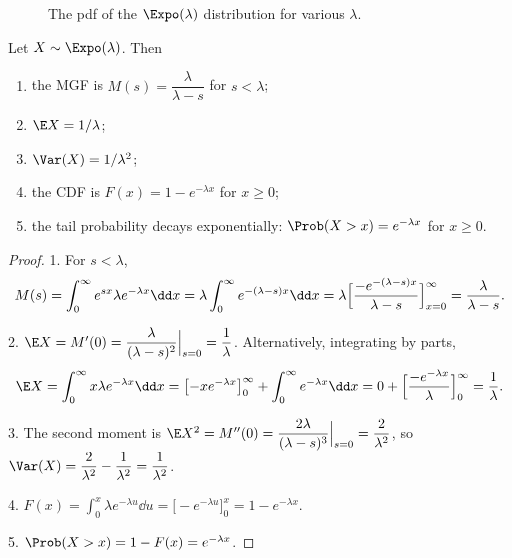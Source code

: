 \begin{figure}[ht]
\centering
{}
\caption{The pdf of the $\Expo(\lambda)$ distribution for various $\lambda$.}
\label{fig:exponential-pdfs}
\end{figure}


\begin{theorem}\label{thm:exponential-properties}
Let $X \sim \Expo(\lambda)$. Then
\begin{enumerate}
  \item the MGF is $M(s) = \dfrac{\lambda}{\lambda - s}$ for $s < \lambda$;
  \item $\E X = 1/\lambda$;
  \item $\Var(X) = 1/\lambda^2$;
  \item the CDF is $F(x) = 1 - e^{-\lambda x}$ for $x \ge 0$;
  \item the tail probability decays exponentially: $\Prob(X > x) = e^{-\lambda x}$ for $x \ge 0$.
\end{enumerate}
\end{theorem}

\begin{proof}
1. For $s < \lambda$,
\[
  M(s) = \int_0^\infty e^{sx} \lambda e^{-\lambda x} \dd x = \lambda \int_0^\infty e^{-(\lambda - s)x} \dd x = \lambda \Bigl[\frac{-e^{-(\lambda - s)x}}{\lambda - s}\Bigr]_{x=0}^\infty = \frac{\lambda}{\lambda - s}.
\]

2. $\E X = M'(0) = \dfrac{\lambda}{(\lambda - s)^2}\Big|_{s=0} = \dfrac1\lambda$. Alternatively, integrating by parts,
\[
  \E X = \int_0^\infty x \lambda e^{-\lambda x} \dd x = \bigl[-x e^{-\lambda x}\bigr]_0^\infty + \int_0^\infty e^{-\lambda x} \dd x = 0 + \Bigl[\frac{-e^{-\lambda x}}{\lambda}\Bigr]_0^\infty = \frac1\lambda.
\]

3. The second moment is $\E X^2 = M''(0) = \dfrac{2\lambda}{(\lambda - s)^3}\Big|_{s=0} = \dfrac{2}{\lambda^2}$, so $\Var(X) = \dfrac{2}{\lambda^2} - \dfrac{1}{\lambda^2} = \dfrac{1}{\lambda^2}$.

4. $F(x) = \int_0^x \lambda e^{-\lambda u} \dd u = \bigl[-e^{-\lambda u}\bigr]_0^x = 1 - e^{-\lambda x}$.

5. $\Prob(X > x) = 1 - F(x) = e^{-\lambda x}$.
\end{proof}

